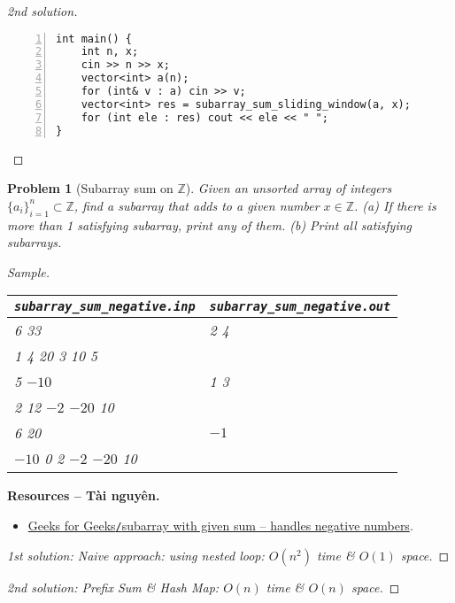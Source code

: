 \documentclass{article}
\newtheorem{problem}{Problem}
\begin{document}
\begin{proof}[2nd solution]
\begin{enumerate}
\begin{Verbatim}[numbers=left,xleftmargin=5mm]
int main() {
    int n, x;
    cin >> n >> x;
    vector<int> a(n);
    for (int& v : a) cin >> v;
    vector<int> res = subarray_sum_sliding_window(a, x);
    for (int ele : res) cout << ele << " ";
}
        \end{Verbatim}
    \end{enumerate}
\end{proof}

\begin{problem}[Subarray sum on $\mathbb{Z}$]
    Given an unsorted array of integers $\{a_i\}_{i=1}^n\subset\mathbb{Z}$, find a subarray that adds to a given number $x\in\mathbb{Z}$. (a) If there is more than 1 satisfying subarray, print any of them. (b) Print all satisfying subarrays.
    \item {\sf Sample.}
    \begin{table}[H]
        \centering
        \begin{tabular}{|l|l|}
            \hline
            \verb|subarray_sum_negative.inp| & \verb|subarray_sum_negative.out| \\
            \hline
            6 33 & 2 4 \\
            1 4 20 3 10 5 & \\
            \hline
            5 $-10$ & 1 3 \\
            2 12 $-2$ $-20$ 10 & \\
            \hline
            6 20 & $-1$ \\
            $-10$ 0 2 $-2$ $-20$ 10 & \\
            \hline
        \end{tabular}
    \end{table}
\end{problem}
\textbf{\textsf{Resources -- Tài nguyên.}}
\begin{itemize}
    \item \href{https://www.geeksforgeeks.org/dsa/find-subarray-with-given-sum-in-array-of-integers/}{Geeks for Geeks{\tt/}subarray with given sum -- handles negative numbers}.
\end{itemize}

\begin{proof}[1st solution: Naive approach: using nested loop: $O(n^2)$ time \& $O(1)$ space]

\end{proof}

\begin{proof}[2nd solution: Prefix Sum \& Hash Map: $O(n)$ time \& $O(n)$ space]

\end{proof}
\end{document}
